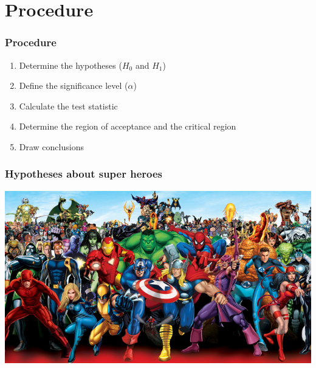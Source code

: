 \documentclass{beamer}
\begin{document}
\section{Procedure}
\sectionframelogo{}

\begin{frame}
  \frametitle{Procedure}

  \begin{enumerate}
    \item Determine the hypotheses ($H_0$ and $H_1$)
    \item Define the significance level ($\alpha$)
    \item Calculate the test statistic
    \item Determine the region of acceptance and the critical region
    \item Draw conclusions
  \end{enumerate}
\end{frame}

\begin{frame}
  \frametitle{Hypotheses about super heroes}

  \includegraphics[width=\textwidth]{img/les5-heroes}
\end{frame}
\end{document}

